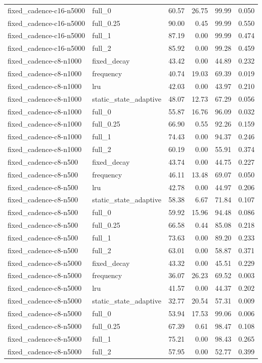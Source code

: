 \begin{longtable}{llrrrr}
fixed\_cadence-c16-n5000 & full\_0 & 60.57 & 26.75 & 99.99 & 0.050\\
fixed\_cadence-c16-n5000 & full\_0.25 & 90.00 & 0.45 & 99.99 & 0.550\\
fixed\_cadence-c16-n5000 & full\_1 & 87.19 & 0.00 & 99.99 & 0.474\\
fixed\_cadence-c16-n5000 & full\_2 & 85.92 & 0.00 & 99.28 & 0.459\\
fixed\_cadence-c8-n1000 & fixed\_decay & 43.42 & 0.00 & 44.89 & 0.232\\
fixed\_cadence-c8-n1000 & frequency & 40.74 & 19.03 & 69.39 & 0.019\\
fixed\_cadence-c8-n1000 & lru & 42.03 & 0.00 & 43.97 & 0.210\\
fixed\_cadence-c8-n1000 & static\_state\_adaptive & 48.07 & 12.73 & 67.29 & 0.056\\
fixed\_cadence-c8-n1000 & full\_0 & 55.87 & 16.76 & 96.09 & 0.032\\
fixed\_cadence-c8-n1000 & full\_0.25 & 66.90 & 0.55 & 92.26 & 0.159\\
fixed\_cadence-c8-n1000 & full\_1 & 74.43 & 0.00 & 94.37 & 0.246\\
fixed\_cadence-c8-n1000 & full\_2 & 60.19 & 0.00 & 55.91 & 0.374\\
fixed\_cadence-c8-n500 & fixed\_decay & 43.74 & 0.00 & 44.75 & 0.227\\
fixed\_cadence-c8-n500 & frequency & 46.11 & 13.48 & 69.07 & 0.050\\
fixed\_cadence-c8-n500 & lru & 42.78 & 0.00 & 44.97 & 0.206\\
fixed\_cadence-c8-n500 & static\_state\_adaptive & 58.38 & 6.67 & 71.84 & 0.107\\
fixed\_cadence-c8-n500 & full\_0 & 59.92 & 15.96 & 94.48 & 0.086\\
fixed\_cadence-c8-n500 & full\_0.25 & 66.58 & 0.44 & 85.08 & 0.218\\
fixed\_cadence-c8-n500 & full\_1 & 73.63 & 0.00 & 89.20 & 0.233\\
fixed\_cadence-c8-n500 & full\_2 & 63.01 & 0.00 & 58.87 & 0.371\\
fixed\_cadence-c8-n5000 & fixed\_decay & 43.32 & 0.00 & 45.51 & 0.229\\
fixed\_cadence-c8-n5000 & frequency & 36.07 & 26.23 & 69.52 & 0.003\\
fixed\_cadence-c8-n5000 & lru & 41.57 & 0.00 & 44.37 & 0.202\\
fixed\_cadence-c8-n5000 & static\_state\_adaptive & 32.77 & 20.54 & 57.31 & 0.009\\
fixed\_cadence-c8-n5000 & full\_0 & 53.94 & 17.53 & 99.06 & 0.006\\
fixed\_cadence-c8-n5000 & full\_0.25 & 67.39 & 0.61 & 98.47 & 0.108\\
fixed\_cadence-c8-n5000 & full\_1 & 75.21 & 0.00 & 98.43 & 0.265\\
fixed\_cadence-c8-n5000 & full\_2 & 57.95 & 0.00 & 52.77 & 0.399\\
\bottomrule\end{longtable}